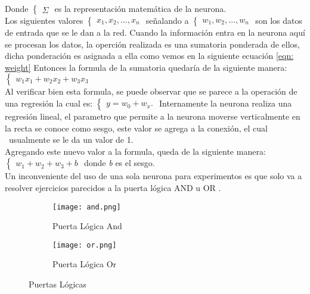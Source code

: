         Donde
        $\begin{cases}  
            \Sigma
        \end{cases}$
        es la representaci\'on matem\'atica de la neurona. \\
        Los siguientes valores
        $\begin{cases}
            x_1, x_2, ... , x_n
        \end{cases}$
        señalando a 
        $\begin{cases} \label{eqn: weight}
            w_1, w_2, ... , w_n 
        \end{cases}$ 
        son los datos de entrada que se le dan a la red.
        Cuando la información entra en la neurona aqu\'i se procesan los datos, la operci\'on realizada 
        es una sumatoria ponderada de ellos, dicha ponderaci\'on es asignada a ella  como vemos en la siguiente 
        ecuaci\'on \eqref{eqn: weight}
        Entonces la formula de la sumatoria quedar\'ia de la siguiente manera:
        $\begin{cases} \label{eqn: summation}
            w_1x_1 + w_2x_2 + w_3x_3
        \end{cases}$ \\
        Al verificar bien esta formula, se puede observar que se parece a la operaci\'on de una regresi\'on 
        la cual es:
        $\begin{cases}
            y = w_0 + w_x.
        \end{cases}$
        Internamente la neurona realiza una regresi\'on lineal, el parametro que permite a la neurona 
        moverse verticalmente en la recta se conoce como sesgo, este valor se agrega a la conexi\'on, el cual \
        usualmente se le da un valor de 1. \\
        Agregando este nuevo valor a la formula, queda de la siguiente manera: \\
        $\begin{cases}
            w_1 + w_2 + w_3 + b
        \end{cases}$ 
        donde \textit{b} es el sesgo. \\
        
        Un inconveniente del uso de una sola neurona para experimentos es que solo 
        va a resolver ejercicios parecidos a la puerta l\'ogica AND u OR \label{sec: one neuron}.
        
        \begin{figure}[H]
            \begin{subfigure}[H]{0.49\textwidth}
                \texttt{[image: and.png]}
                \caption{Puerta L\'ogica And}
                \label{fig:f1}
            \end{subfigure}
            \hfill
            \begin{subfigure}[H]{0.49\textwidth}
                \texttt{[image: or.png]}
                \caption{Puerta L\'ogica Or}
                \label{fig:f2}
            \end{subfigure}
            \caption{Puertas L\'ogicas \cite{mcmahon2014}}
        \end{figure}
        
